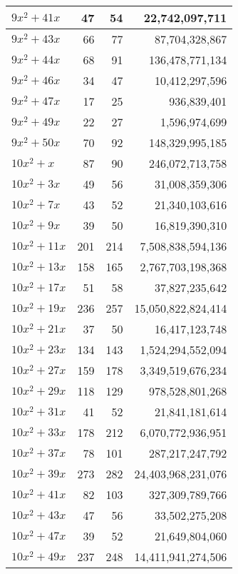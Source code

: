 \documentclass[a4paper]{amsproc}
\theoremstyle{plain}
\theoremstyle{named}
\begin{document}
\begin{longtable}{ | l | r | r | r | }
$9x^2 + 41x$ & 47 & 54 & 22{,}742{,}097{,}711 \\ \hline
$9x^2 + 43x$ & 66 & 77 & 87{,}704{,}328{,}867 \\ \hline
$9x^2 + 44x$ & 68 & 91 & 136{,}478{,}771{,}134 \\ \hline
$9x^2 + 46x$ & 34 & 47 & 10{,}412{,}297{,}596 \\ \hline
$9x^2 + 47x$ & 17 & 25 & 936{,}839{,}401 \\ \hline
$9x^2 + 49x$ & 22 & 27 & 1{,}596{,}974{,}699 \\ \hline
$9x^2 + 50x$ & 70 & 92 & 148{,}329{,}995{,}185 \\ \hline
$10x^2 + x$ & 87 & 90 & 246{,}072{,}713{,}758 \\ \hline
$10x^2 + 3x$ & 49 & 56 & 31{,}008{,}359{,}306 \\ \hline
$10x^2 + 7x$ & 43 & 52 & 21{,}340{,}103{,}616 \\ \hline
$10x^2 + 9x$ & 39 & 50 & 16{,}819{,}390{,}310 \\ \hline
$10x^2 + 11x$ & 201 & 214 & 7{,}508{,}838{,}594{,}136 \\ \hline
$10x^2 + 13x$ & 158 & 165 & 2{,}767{,}703{,}198{,}368 \\ \hline
$10x^2 + 17x$ & 51 & 58 & 37{,}827{,}235{,}642 \\ \hline
$10x^2 + 19x$ & 236 & 257 & 15{,}050{,}822{,}824{,}414 \\ \hline
$10x^2 + 21x$ & 37 & 50 & 16{,}417{,}123{,}748 \\ \hline
$10x^2 + 23x$ & 134 & 143 & 1{,}524{,}294{,}552{,}094 \\ \hline
$10x^2 + 27x$ & 159 & 178 & 3{,}349{,}519{,}676{,}234 \\ \hline
$10x^2 + 29x$ & 118 & 129 & 978{,}528{,}801{,}268 \\ \hline
$10x^2 + 31x$ & 41 & 52 & 21{,}841{,}181{,}614 \\ \hline
$10x^2 + 33x$ & 178 & 212 & 6{,}070{,}772{,}936{,}951 \\ \hline
$10x^2 + 37x$ & 78 & 101 & 287{,}217{,}247{,}792 \\ \hline
$10x^2 + 39x$ & 273 & 282 & 24{,}403{,}968{,}231{,}076 \\ \hline
$10x^2 + 41x$ & 82 & 103 & 327{,}309{,}789{,}766 \\ \hline
$10x^2 + 43x$ & 47 & 56 & 33{,}502{,}275{,}208 \\ \hline
$10x^2 + 47x$ & 39 & 52 & 21{,}649{,}804{,}060 \\ \hline
$10x^2 + 49x$ & 237 & 248 & 14{,}411{,}941{,}274{,}506 \\ \hline

\end{longtable}
\end{document}
